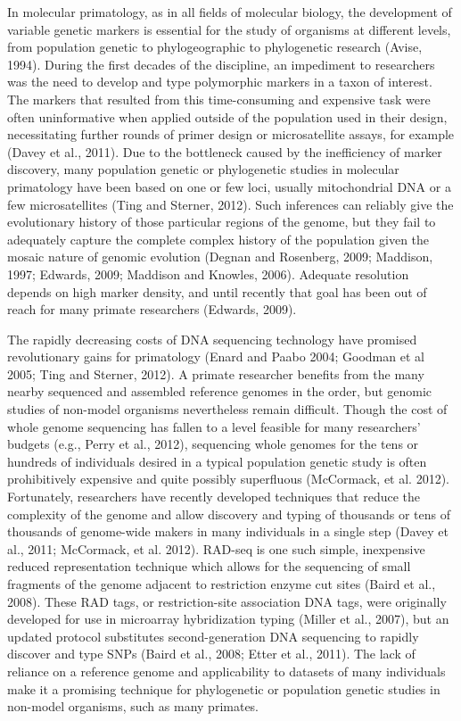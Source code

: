 \documentclass[12pt]{article}
\begin{document}
In molecular primatology, as in all fields of molecular biology, the development of variable genetic markers is essential for the study of organisms at different levels, from population genetic to phylogeographic to phylogenetic research (Avise, 1994). During the first decades of the discipline, an impediment to researchers was the need to develop and type polymorphic markers in a taxon of interest. The markers that resulted from this time-consuming and expensive task were often uninformative when applied outside of the population used in their design, necessitating further rounds of primer design or microsatellite assays, for example (Davey et al., 2011). Due to the bottleneck caused by the inefficiency of marker discovery, many population genetic or phylogenetic studies in molecular primatology have been based on one or few loci, usually mitochondrial DNA or a few microsatellites (Ting and Sterner, 2012). Such inferences can reliably give the evolutionary history of those particular regions of the genome, but they fail to adequately capture the complete complex history of the population given the mosaic nature of genomic evolution (Degnan and Rosenberg, 2009; Maddison, 1997; Edwards, 2009; Maddison and Knowles, 2006). Adequate resolution depends on high marker density, and until recently that goal has been out of reach for many primate researchers (Edwards, 2009).

The rapidly decreasing costs of DNA sequencing technology have promised revolutionary gains for primatology (Enard and Paabo 2004; Goodman et al 2005; Ting and Sterner, 2012). A primate researcher benefits from the many nearby sequenced and assembled reference genomes in the order, but genomic studies of non-model organisms nevertheless remain difficult. Though the cost of whole genome sequencing has fallen to a level feasible for many researchers' budgets (e.g., Perry et al., 2012), sequencing whole genomes for the tens or hundreds of individuals desired in a typical population genetic study is often prohibitively expensive and quite possibly superfluous (McCormack, et al. 2012). Fortunately, researchers have recently developed techniques that reduce the complexity of the genome and allow discovery and typing of thousands or tens of thousands of genome-wide makers in many individuals in a single step (Davey et al., 2011; McCormack, et al. 2012). RAD-seq is one such simple, inexpensive reduced representation technique which allows for the sequencing of small fragments of the genome adjacent to restriction enzyme cut sites (Baird et al., 2008). These RAD tags, or restriction-site association DNA tags, were originally developed for use in microarray hybridization typing (Miller et al., 2007), but an updated protocol substitutes second-generation DNA sequencing to rapidly discover and type SNPs (Baird et al., 2008; Etter et al., 2011). The lack of reliance on a reference genome and applicability to datasets of many individuals make it a promising technique for phylogenetic or population genetic studies in non-model organisms, such as many primates.
\end{document}
